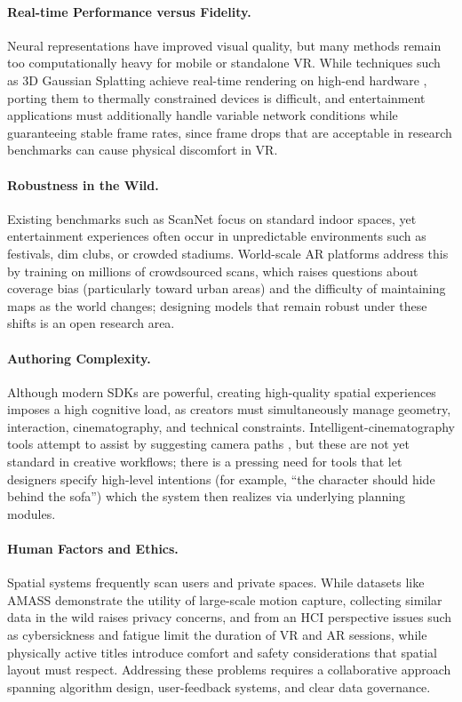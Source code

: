 \paragraph{Real-time Performance versus Fidelity.} Neural representations have improved visual quality, but many methods remain too computationally heavy for mobile or standalone VR. While techniques such as 3D Gaussian Splatting achieve real-time rendering on high-end hardware \cite{kerbl20233d}, porting them to thermally constrained devices is difficult, and entertainment applications must additionally handle variable network conditions while guaranteeing stable frame rates, since frame drops that are acceptable in research benchmarks can cause physical discomfort in VR.

\paragraph{Robustness in the Wild.} Existing benchmarks such as ScanNet focus on standard indoor spaces, yet entertainment experiences often occur in unpredictable environments such as festivals, dim clubs, or crowded stadiums. World-scale AR platforms address this by training on millions of crowdsourced scans, which raises questions about coverage bias (particularly toward urban areas) and the difficulty of maintaining maps as the world changes; designing models that remain robust under these shifts is an open research area.

\paragraph{Authoring Complexity.} Although modern SDKs are powerful, creating high-quality spatial experiences imposes a high cognitive load, as creators must simultaneously manage geometry, interaction, cinematography, and technical constraints. Intelligent-cinematography tools attempt to assist by suggesting camera paths \cite{azzarelli2025intelligentcine}, but these are not yet standard in creative workflows; there is a pressing need for tools that let designers specify high-level intentions (for example, ``the character should hide behind the sofa'') which the system then realizes via underlying planning modules.

\paragraph{Human Factors and Ethics.} Spatial systems frequently scan users and private spaces. While datasets like AMASS demonstrate the utility of large-scale motion capture, collecting similar data in the wild raises privacy concerns, and from an HCI perspective issues such as cybersickness and fatigue limit the duration of VR and AR sessions, while physically active titles introduce comfort and safety considerations that spatial layout must respect. Addressing these problems requires a collaborative approach spanning algorithm design, user-feedback systems, and clear data governance.
